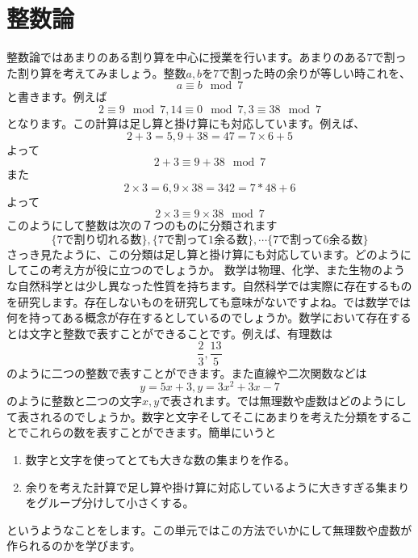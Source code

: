 \documentclass{ltjsarticle}
\begin{document}
\section{整数論}
整数論ではあまりのある割り算を中心に授業を行います。あまりのある$7$で割った割り算を考えてみましょう。整数$a,b$を$7$で割った時の余りが等しい時これを、
\begin{equation*}
a\equiv b\mod{7}
\end{equation*}
と書きます。例えば
\begin{equation*}
2\equiv 9\mod{7},14\equiv 0\mod{7},3\equiv 38\mod{7}
\end{equation*}
となります。この計算は足し算と掛け算にも対応しています。例えば、
\begin{equation*}
2+ 3 = 5, 9 + 38 = 47 = 7\times 6 + 5
\end{equation*}
よって
\begin{equation*}
2+3 \equiv 9+38 \mod{7}
\end{equation*}
また
\begin{equation*}
2\times 3 = 6, 9 \times 38 = 342 = 7 * 48+6
\end{equation*}
よって
\begin{equation*}
2\times3 \equiv 9\times38 \mod{7}
\end{equation*}
このようにして整数は次の７つのものに分類されます
\begin{equation*}
\{\text{$7$で割り切れる数}\},\{\text{$7$で割って$1$余る数}\},\cdots\{\text{$7$で割って$6$余る数}\}
\end{equation*}
さっき見たように、この分類は足し算と掛け算にも対応しています。どのようにしてこの考え方が役に立つのでしょうか。
数学は物理、化学、また生物のような自然科学とは少し異なった性質を持ちます。自然科学では実際に存在するものを研究します。存在しないものを研究しても意味がないですよね。では数学では何を持ってある概念が存在するとしているのでしょうか。数学において存在するとは文字と整数で表すことができることです。例えば、有理数は
\begin{equation*}
{\frac 2 3},{\frac {13} 5}
\end{equation*}
のように二つの整数で表すことができます。また直線や二次関数などは
\begin{equation*}
y = 5x+3, y = 3x^2+3x-7
\end{equation*}
のように整数と二つの文字$x,y$で表されます。では無理数や虚数はどのようにして表されるのでしょうか。数字と文字そしてそこにあまりを考えた分類をすることでこれらの数を表すことができます。簡単にいうと
\begin{enumerate}[ステップ1：]
\item 数字と文字を使ってとても大きな数の集まりを作る。
\item 余りを考えた計算で足し算や掛け算に対応しているように大きすぎる集まりをグループ分けして小さくする。
\end{enumerate}
というようなことをします。この単元ではこの方法でいかにして無理数や虚数が作られるのかを学びます。
\end{document}
